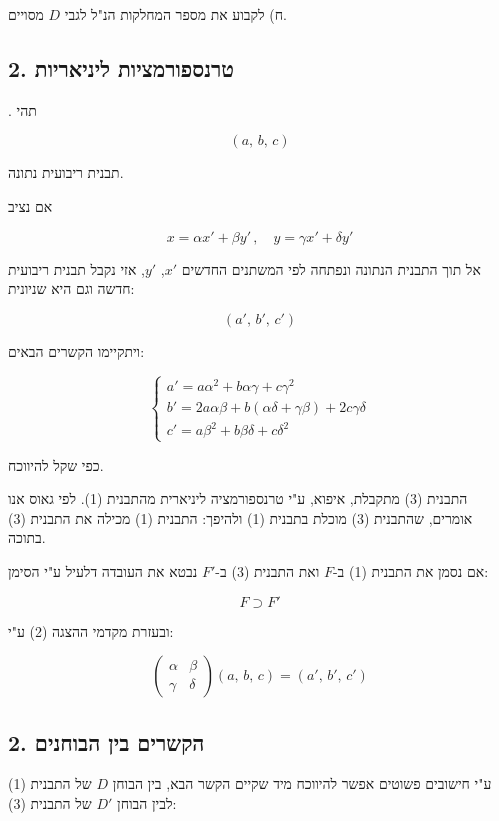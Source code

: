 \medskip
\noindent ח) לקבוע את מספר המחלקות הנ"ל לגבי $D$ מסויים.

\bigskip
\hrulefill

\subsection*{2. טרנספורמציות ליניאריות}

. תהי

\[ (a,\, b,\, c) \tag{1} \]

תבנית ריבועית נתונה.

\medskip
אם נציב

\[ x = \alpha x' + \beta y' \, , \quad y = \gamma x' + \delta y' \tag{2} \]

אל תוך התבנית הנתונה ונפתחה לפי המשתנים החדשים $x'$, $y'$, אזי נקבל תבנית ריבועית חדשה וגם היא שניונית:

\[ (a',\, b',\, c') \tag{3} \]

ויתקיימו הקשרים הבאים:

\[
\begin{cases}
a' = a\alpha^2 + b\alpha\gamma + c\gamma^2 \\
b' = 2a\alpha\beta + b(\alpha\delta + \gamma\beta) + 2c\gamma\delta \\
c' = a\beta^2 + b\beta\delta + c\delta^2
\end{cases}
\tag{4}
\]

כפי שקל להיווכח.

\medskip
התבנית (3) מתקבלת, איפוא, ע"י טרנספורמציה ליניארית מהתבנית (1). לפי גאוס אנו אומרים, שהתבנית (3) מוכלת בתבנית (1) ולהיפך: התבנית (1) מכילה את התבנית (3) בתוכה.

\medskip
אם נסמן את התבנית (1) ב-$F$ ואת התבנית (3) ב-$F'$ נבטא את העובדה דלעיל ע"י הסימן:

\[ F \supset F' \]

ובעזרת מקדמי ההצגה (2) ע"י:

\[
\begin{pmatrix} \alpha & \beta \\ \gamma & \delta \end{pmatrix} (a,\,b,\,c) = (a',\,b',\,c')
\]

\subsection*{2. הקשרים בין הבוחנים}

ע"י חישובים פשוטים אפשר להיווכח מיד שקיים הקשר הבא, בין הבוחן $D$ של התבנית (1) לבין הבוחן $D'$ של התבנית (3):


